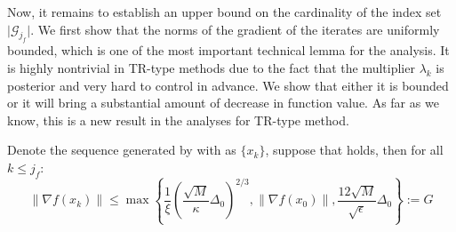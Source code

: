 Now, it remains to establish an upper bound on the cardinality of the index set $\vert \mathcal{G}_{j_f} \vert$. We first show that the norms of the gradient of the iterates are uniformly bounded, which is one of the most important technical lemma for the analysis. It is highly nontrivial in TR-type methods due to the fact that the multiplier $\lambda_k$ is posterior and very hard to control in advance. We show that either it is bounded or it will bring a substantial amount of decrease in function value. As far as we know, this is a new result in the analyses for TR-type method.
\begin{lemma}
    \label{lem.bounded g}
    Denote the sequence generated by  with  as $\{x_k\}$, suppose that  holds, then for all $k\leq j_f$:
    \begin{equation}
        \label{eq.uniform upperbound g}
        \|\nabla f(x_k) \| \leq \max\left \{\frac{1}{\xi}\left (\frac{\sqrt{M}}{\kappa}\Delta_0\right)^{2/3},\|\nabla f(x_0)\|,\frac{12\sqrt{M}}{\sqrt{\epsilon}}\Delta_0\right\}:=G
    \end{equation}
\end{lemma}
